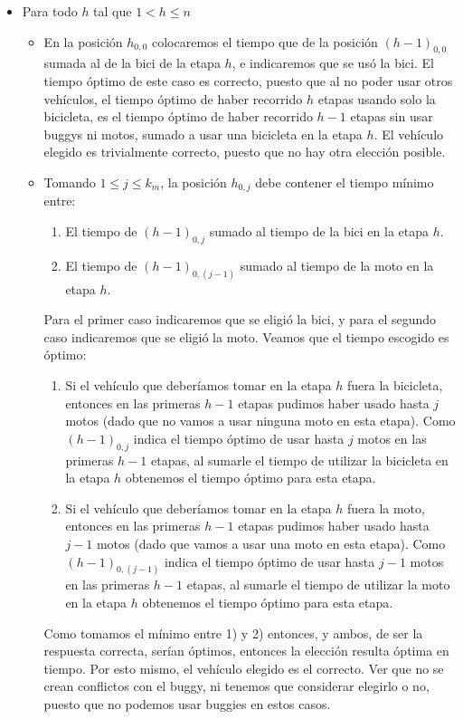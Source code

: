 \begin{itemize}
	\item Para todo $h$ tal que $1 < h \leq n$
	\begin{itemize}
		\item En la posición $h_{0,0}$ colocaremos el tiempo que de la posición $(h-1)_{0,0}$ sumada al de la bici de la etapa $h$, e indicaremos que se usó la bici. El tiempo óptimo de este caso es correcto, puesto que al no poder usar otros vehículos, el tiempo óptimo de haber recorrido $h$ etapas usando solo la bicicleta, es el tiempo óptimo de haber recorrido $h-1$ etapas sin usar buggys ni motos, sumado a usar una bicicleta en la etapa $h$. El vehículo elegido es trivialmente correcto, puesto que no hay otra elección posible. 
		\item Tomando $1 \leq j \leq k_{m}$, la posición $h_{0,j}$ debe contener el tiempo mínimo entre:
		\begin{enumerate}
			\item El tiempo de $(h-1)_{0,j}$ sumado al tiempo de la bici en la etapa $h$.
			\item El tiempo de $(h-1)_{0,(j-1)}$ sumado al tiempo de la moto en la etapa $h$.
		\end{enumerate} 
		Para el primer caso indicaremos que se eligió la bici, y para el segundo caso indicaremos que se eligió la moto. Veamos que el tiempo escogido es óptimo:
		\begin{enumerate}
			\item Si el vehículo que deberíamos tomar en la etapa $h$ fuera la bicicleta, entonces en las primeras $h-1$ etapas pudimos haber usado hasta $j$ motos (dado que no vamos a usar ninguna moto en esta etapa).  Como $(h-1)_{0,j}$ indica el tiempo óptimo de usar hasta $j$ motos en las primeras $h-1$ etapas, al sumarle el tiempo de utilizar la bicicleta en la etapa $h$ obtenemos el tiempo óptimo para esta etapa.
			\item Si el vehículo que deberíamos tomar en la etapa $h$ fuera la moto, entonces en las primeras $h-1$ etapas pudimos haber usado hasta $j-1$ motos (dado que vamos a usar una moto en esta etapa).  Como $(h-1)_{0,(j-1)}$ indica el tiempo óptimo de usar hasta $j-1$ motos en las primeras $h-1$ etapas, al sumarle el tiempo de utilizar la moto en la etapa $h$ obtenemos el tiempo óptimo para esta etapa.
		\end{enumerate}
		Como tomamos el mínimo entre 1) y 2) entonces, y ambos, de ser la respuesta correcta, serían óptimos, entonces la elección resulta óptima en tiempo. Por esto mismo, el vehículo elegido es el correcto. Ver que no se crean conflictos con el buggy, ni tenemos que considerar elegirlo o no, puesto que no podemos usar buggies en estos casos.

\end{itemize}
\end{itemize}
